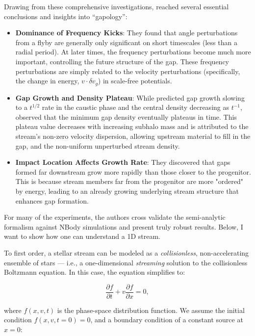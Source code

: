             Drawing from these comprehensive investigations, \citet{2016MNRAS.457.3817S} reached several essential conclusions and insights into ``gapology'':
            \begin{itemize}
                \item \textbf{Dominance of Frequency Kicks}: They found that angle perturbations from a flyby are generally only significant on short timescales (less than a radial period). At later times, the frequency perturbations become much more important, controlling the future structure of the gap. These frequency perturbations are simply related to the velocity perturbations (specifically, the change in energy, $v \cdot \delta v_g$) in scale-free potentials.
                \item \textbf{Gap Growth and Density Plateau}: While \citet{2015MNRAS.450.1136E} predicted gap growth slowing to a $t^{1/2}$ rate in the caustic phase and the central density decreasing as $t^{-1}$, \citet{2016MNRAS.457.3817S} observed that the minimum gap density eventually plateaus in time. This plateau value decreases with increasing subhalo mass and is attributed to the stream's non-zero velocity dispersion, allowing upstream material to fill in the gap, and the non-uniform unperturbed stream density.
                \item \textbf{Impact Location Affects Growth Rate}: They discovered that gaps formed far downstream grow more rapidly than those closer to the progenitor. This is because stream members far from the progenitor are more "ordered" by energy, leading to an already growing underlying stream structure that enhances gap formation.
            \end{itemize}
            For many of the experiments, the authors cross validate the semi-analytic formalism against NBody simulations and present truly robust results. Below, I want to show how one can understand a 1D stream. 


            To first order, a stellar stream can be modeled as a \textit{collisionless}, non-accelerating ensemble of stars — i.e., a one-dimensional \textit{streaming} solution to the collisionless Boltzmann equation. In this case, the equation simplifies to:

            \begin{equation}
                \frac{\partial f}{\partial t} + v \frac{\partial f}{\partial x} = 0,
            \end{equation}

            where \( f(x,v,t) \) is the phase-space distribution function. We assume the initial condition \( f(x,v,t=0) = 0 \), and a boundary condition of a constant source at \( x=0 \):

